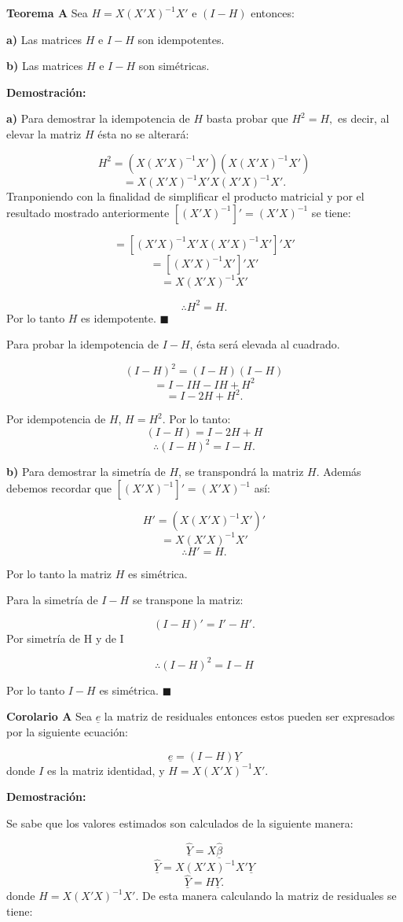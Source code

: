 \documentclass[
  a4paper,
  oneside,
  openany]{book}
\begin{document}
\textbf{Teorema A} Sea \(H=X(X'X)^{-1}X'\) e \((I-H)\) entonces:

\textbf{a)} Las matrices \(H\) e \(I-H\) son idempotentes.

\textbf{b)} Las matrices \(H\) e \(I-H\) son simétricas.

\textbf{Demostración:}

\textbf{a)} Para demostrar la idempotencia de \(H\) basta probar que \(H^2=H,\) es decir, al elevar la matriz \(H\) ésta no se alterará:

\[H^2=(X(X'X)^{-1}X')(X(X'X)^{-1}X')\]
\[=X(X'X)^{-1}X'X(X'X)^{-1}X'.\]
Tranponiendo con la finalidad de simplificar el producto matricial y por el resultado mostrado anteriormente \([(X'X)^{-1}]'=(X'X)^{-1}\) se tiene:

\[=[(X'X)^{-1}X'X(X'X)^{-1}X']'X'\]
\[=[(X'X)^{-1}X']'X'\]
\[=X(X'X)^{-1}X'\]

\[\therefore H^2=H.\]
Por lo tanto \(H\) es idempotente. \(\blacksquare\)

Para probar la idempotencia de \(I-H\), ésta será elevada al cuadrado.

\[(I-H)^2=(I-H)(I-H)\]
\[=I-IH-IH+H^2\]
\[=I-2H+H^2.\]

Por idempotencia de \(H\), \(H=H^2\). Por lo tanto:
\[(I-H)=I-2H+H\]
\[\therefore (I-H)^2=I-H.\]

\textbf{b)} Para demostrar la simetría de \(H\), se transpondrá la matriz \(H\). Además debemos recordar que \([(X'X)^{-1}]'=(X'X)^{-1}\) así:

\[H'= (X(X'X)^{-1}X')'\]
\[=X(X'X)^{-1}X'\]
\[\therefore H'= H.\]

Por lo tanto la matriz \(H\) es simétrica.

Para la simetría de \(I-H\) se transpone la matriz:

\[(I-H)'=I'-H'.\]
Por simetría de H y de I

\[\therefore (I-H)^2=I-H\]

Por lo tanto \(I-H\) es simétrica. \(\blacksquare\)

\textbf{Corolario A} Sea \(\underline{e}\) la matriz de residuales entonces estos pueden ser expresados por la siguiente ecuación:

\[\underline{e}=(I-H)\underline{Y}\]
donde \(I\) es la matriz identidad, y \(H=X(X'X)^{-1}X'.\)

\textbf{Demostración:}

Se sabe que los valores estimados son calculados de la siguiente manera:

\[\underline{\hat{Y}}=X\underline{\hat{\beta}}\]
\[\underline{\hat{Y}}=X(X'X)^{-1}X'\underline{Y}\]
\[\underline{\hat{Y}}=H\underline{Y}.\]
donde \(H=X(X'X)^{-1}X'.\) De esta manera calculando la matriz de residuales se tiene:
\end{document}
